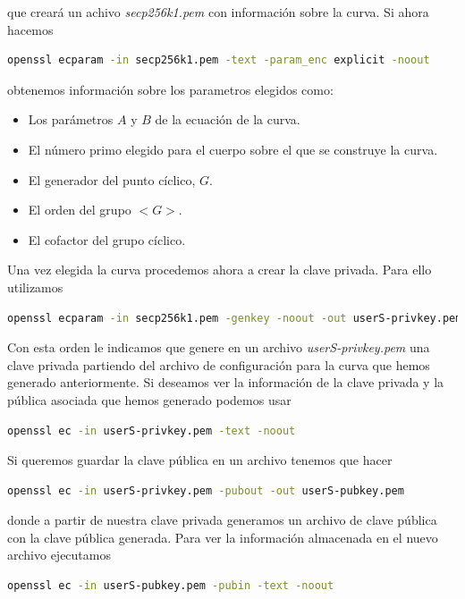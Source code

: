 \documentclass{article}
\begin{document}
que creará un achivo \textit{secp256k1.pem} con información sobre la curva. Si
ahora hacemos

\begin{lstlisting}[language=bash]
  openssl ecparam -in secp256k1.pem -text -param_enc explicit -noout
\end{lstlisting}

obtenemos información sobre los parametros elegidos como: 

\begin{itemize}
  \item Los parámetros $A$ y $B$ de la ecuación de la curva.
  \item El número primo elegido para el cuerpo sobre el que se construye la curva.
  \item El generador del punto cíclico, $G$.
  \item El orden del grupo $<G>$.
  \item El cofactor del grupo cíclico.
\end{itemize}

Una vez elegida la curva procedemos ahora a crear la clave privada. Para ello
utilizamos 

\label{genkey}
\begin{lstlisting}[language=bash]
  openssl ecparam -in secp256k1.pem -genkey -noout -out userS-privkey.pem
\end{lstlisting}

Con esta orden le indicamos que genere en un archivo \textit{userS-privkey.pem}
una clave privada partiendo del archivo de configuración para la curva que hemos
generado anteriormente. Si deseamos ver la información de la clave privada y la pública asociada que
hemos generado podemos usar 

\begin{lstlisting}[language=bash]
  openssl ec -in userS-privkey.pem -text -noout
\end{lstlisting}

Si queremos guardar la clave pública en un archivo tenemos que hacer 

\begin{lstlisting}[language=bash]
  openssl ec -in userS-privkey.pem -pubout -out userS-pubkey.pem
\end{lstlisting}

donde a partir de nuestra clave privada generamos un archivo de clave pública
con la clave pública generada. Para ver la información almacenada en el nuevo
archivo ejecutamos

\begin{lstlisting}[language=bash]
  openssl ec -in userS-pubkey.pem -pubin -text -noout
\end{lstlisting}
\end{document}
